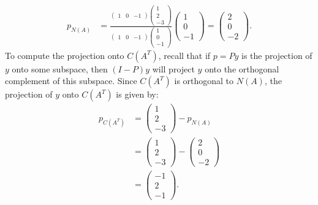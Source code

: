 \documentclass[11pt]{article}
\begin{document}
\begin{enumerate}[(a)]
\begin{align*}
p_{N(A)} & =\frac{{\begin{pmatrix}1 & 0 & -1\end{pmatrix}\begin{pmatrix}1\\
2\\
-3
\end{pmatrix}}}{\begin{pmatrix}1 & 0 & -1\end{pmatrix}\begin{pmatrix}1\\
0\\
-1
\end{pmatrix}}\begin{pmatrix}1\\
0\\
-1
\end{pmatrix}=\begin{pmatrix}2\\
0\\
-2
\end{pmatrix}.
\end{align*}
To compute the projection onto $C(A^{T})$, recall that if $p=Py$
is the projection of $y$ onto some subspace, then $(I-P)y$ will
project $y$ onto the orthogonal complement of this subspace. Since
$C(A^{T})$ is orthogonal to $N(A)$, the projection of $y$ onto
$C(A^{T})$ is given by:
\begin{align*}
p_{C(A^{T})} & =\begin{pmatrix}1\\
2\\
-3
\end{pmatrix}-p_{N(A)}\\
 & =\begin{pmatrix}1\\
2\\
-3
\end{pmatrix}-\begin{pmatrix}2\\
0\\
-2
\end{pmatrix}\\
 & =\begin{pmatrix}-1\\
2\\
-1
\end{pmatrix}.
\end{align*}
\end{enumerate}

\newpage
\end{document}
